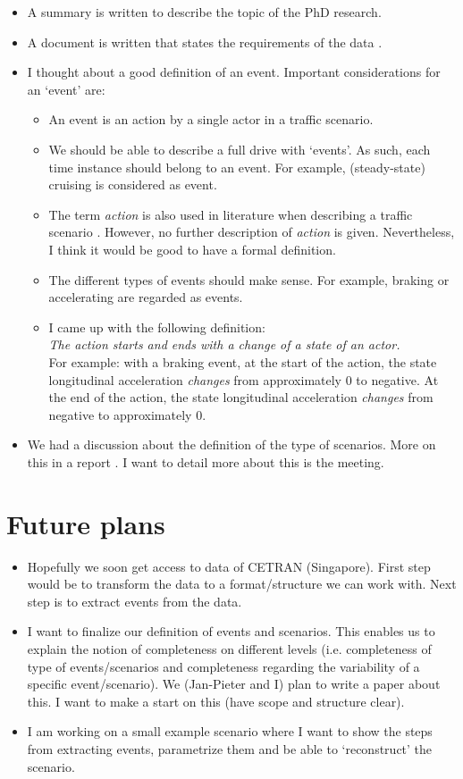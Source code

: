 \documentclass[10pt,final,a4paper,oneside,onecolumn]{article}
\begin{document}
\begin{itemize}
	\item A summary is written to describe the topic of the PhD research.
	\item A document is written that states the requirements of the data \cite{data_requirements}.
	\item I thought about a good definition of an event. Important considerations for an `event' are:
	\begin{itemize}
		\item An event is an action by a single actor in a traffic scenario.
		\item We should be able to describe a full drive with `events'. As such, each time instance should belong to an event. For example, (steady-state) cruising is considered as event.
		\item The term \emph{action} is also used in literature when describing a traffic scenario \cite{scenario_ontology,ulbrich2015}. However, no further description of \emph{action} is given. Nevertheless, I think it would be good to have a formal definition.
		\item The different types of events should make sense. For example, braking or accelerating are regarded as events.
		\item I came up with the following definition:\\
		\emph{The action starts and ends with a change of a state of an actor.} \\
		For example: with a braking event, at the start of the action, the state longitudinal acceleration \emph{changes} from approximately 0 to negative. At the end of the action, the state longitudinal acceleration \emph{changes} from negative to approximately 0.
	\end{itemize}
	\item We had a discussion about the definition of the type of scenarios. More on this in a report \cite{categorizationScenarios}. I want to detail more about this is the meeting.
\end{itemize}

\section*{Future plans}
\begin{itemize}
	\item Hopefully we soon get access to data of CETRAN (Singapore). First step would be to transform the data to a format/structure we can work with. Next step is to extract events from the data.
	\item I want to finalize our definition of events and scenarios. This enables us to explain the notion of completeness on different levels (i.e. completeness of type of events/scenarios and completeness regarding the variability of a specific event/scenario). We (Jan-Pieter and I) plan to write a paper about this. I want to make a start on this (have scope and structure clear).
	\item I am working on a small example scenario where I want to show the steps from extracting events, parametrize them and be able to `reconstruct' the scenario.
\end{itemize}
\end{document}
